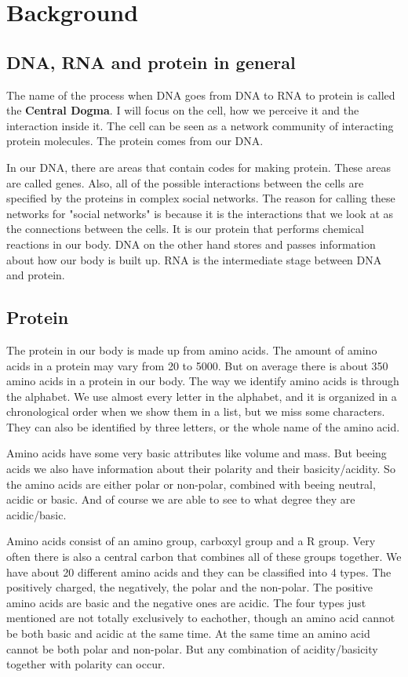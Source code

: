 \documentclass[UKenglish,11pt,a4paper]{article}
\begin{document}
\section*{Background}
\subsection*{DNA, RNA and protein in general}
The name of the process when DNA goes from DNA to RNA to protein is called the \textbf{Central Dogma}. I will focus on
the cell, how we perceive it and the interaction inside it. The cell can be seen as a network community of
interacting protein molecules. The protein comes from our DNA.

In our DNA, there are areas that contain codes for making protein. These areas are called genes. Also, all of the
possible interactions between the cells are specified by the proteins in complex social networks. The reason for calling
these networks for "social networks" is because it is the interactions that we look at as the connections between the
cells. It is our protein that performs chemical reactions in our body. DNA on the other hand stores and passes
information about how our body is built up. RNA is the intermediate stage between DNA and protein.

\subsection*{Protein}
The protein in our body is made up from amino acids. The amount of amino acids in a protein may vary from 20 to 5000. But
on average there is about 350 amino acids in a protein in our body. The way we identify amino acids is through the
alphabet. We use almost every letter in the alphabet, and it is organized in a chronological order when we show
them in a list, but we miss some characters. They can also be identified by three letters, or the whole name of the
amino acid.

Amino acids have some very basic attributes like volume and mass. But beeing acids we also have information about their
polarity and their basicity/acidity. So the amino acids are either polar or non-polar, combined with beeing neutral,
acidic or basic. And of course we are able to see to what degree they are acidic/basic.

Amino acids consist of an amino group, carboxyl group and a R group. Very often there is also a central carbon that
combines all of these groups together. We have about 20 different amino acids and they can be classified into 4 types.
The positively charged, the negatively, the polar and the non-polar. The positive amino acids are basic and the negative
ones are acidic. The four types just mentioned are not totally exclusively to eachother, though an amino acid cannot be
both basic and acidic at the same time. At the same time an amino acid cannot be both polar and non-polar. But any
combination of acidity/basicity together with polarity can occur.
\end{document}
